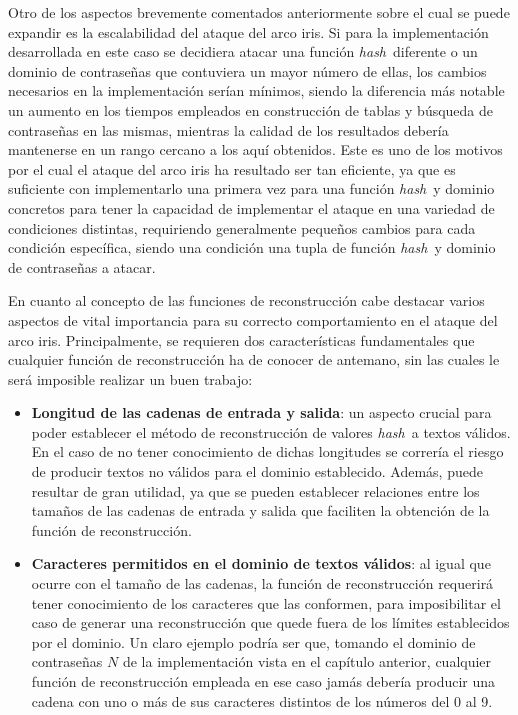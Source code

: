 \documentclass[12pt,spanish,listoffigures,listoftables,listofalgorithms]{tfgetsinf}
\newcommand{\hash}{\textit{hash}}
\begin{document}
Otro de los aspectos brevemente comentados anteriormente sobre el cual se puede expandir es la escalabilidad del ataque del arco iris. Si para la implementación desarrollada en este caso se decidiera atacar una función \hash~diferente o un dominio de contraseñas que contuviera un mayor número de ellas, los cambios necesarios en la implementación serían mínimos, siendo la diferencia más notable un aumento en los tiempos empleados en construcción de tablas y búsqueda de contraseñas en las mismas, mientras la calidad de los resultados debería mantenerse en un rango cercano a los aquí obtenidos. Este es uno de los motivos por el cual el ataque del arco iris ha resultado ser tan eficiente, ya que es suficiente con implementarlo una primera vez para una función \hash~y dominio concretos para tener la capacidad de implementar el ataque en una variedad de condiciones distintas, requiriendo generalmente pequeños cambios para cada condición específica, siendo una condición una tupla de función \hash~y dominio de contraseñas a atacar.

En cuanto al concepto de las funciones de reconstrucción cabe destacar varios aspectos de vital importancia para su correcto comportamiento en el ataque del arco iris. Principalmente, se requieren dos características fundamentales que cualquier función de reconstrucción ha de conocer de antemano, sin las cuales le será imposible realizar un buen trabajo:

\begin{itemize}

    \item \textbf{Longitud de las cadenas de entrada y salida}: un aspecto crucial para poder establecer el método de reconstrucción de valores \hash~a textos válidos. En el caso de no tener conocimiento de dichas longitudes se correría el riesgo de producir textos no válidos para el dominio establecido. Además, puede resultar de gran utilidad, ya que se pueden establecer relaciones entre los tamaños de las cadenas de entrada y salida que faciliten la obtención de la función de reconstrucción. 
    
    \item \textbf{Caracteres permitidos en el dominio de textos válidos}: al igual que ocurre con el tamaño de las cadenas, la función de reconstrucción requerirá tener conocimiento de los caracteres que las conformen, para imposibilitar el caso de generar una reconstrucción que quede fuera de los límites establecidos por el dominio. Un claro ejemplo podría ser que, tomando el dominio de contraseñas $N$ de la implementación vista en el capítulo anterior, cualquier función de reconstrucción empleada en ese caso jamás debería producir una cadena con uno o más de sus caracteres distintos de los números del 0 al 9.
    
\end{itemize}
\end{document}
